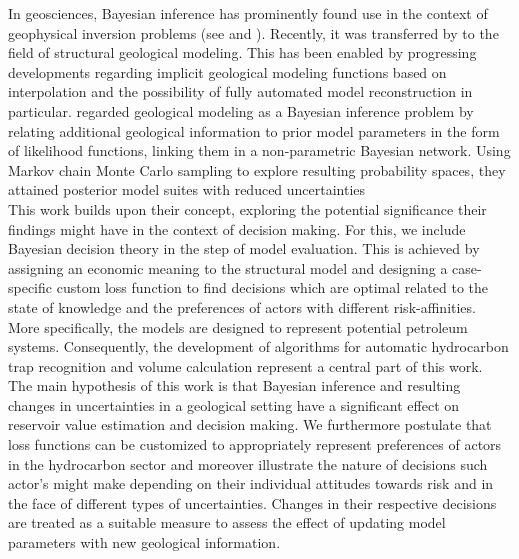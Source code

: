 In geosciences, Bayesian inference has prominently found use in the context of geophysical inversion problems (see \citet{tarantola1982inverse, mosegaard2002probabilistic} and \citet{sambridge2002monte}). Recently, it was transferred by \citet{delaVarga2016} to the field of structural geological modeling. This has been enabled by progressing developments regarding implicit geological modeling functions based on interpolation \citep{hillier2014three, mallet1992discrete, lajaunie1997foliation} and the possibility of fully automated model reconstruction in particular.  \citet{delaVarga2016} regarded geological modeling as a Bayesian inference problem by relating additional geological information to prior model parameters in the form of likelihood functions, linking them in a non-parametric Bayesian network. Using Markov chain Monte Carlo sampling to explore resulting probability spaces, they attained posterior model suites with reduced uncertainties \citep{delaVarga2016}\\
This work builds upon their concept, exploring the potential significance their findings might have in the context of decision making. For this, we include Bayesian decision theory in the step of model evaluation. This is achieved by assigning an economic meaning to the structural model and designing a case-specific custom loss function to find decisions which are optimal related to the state of knowledge and the preferences of actors with different risk-affinities. More specifically, the models are designed to represent potential petroleum systems. Consequently, the development of algorithms for automatic hydrocarbon trap recognition and volume calculation represent a central part of this work.\\
The main hypothesis of this work is that Bayesian inference and resulting changes in uncertainties in a geological setting have a significant effect on reservoir value estimation and decision making. We furthermore postulate that loss functions can be customized to appropriately represent preferences of actors in the hydrocarbon sector and moreover illustrate the nature of decisions such actor's might make depending on their individual attitudes towards risk and in the face of different types of uncertainties. Changes in their respective decisions are treated as a suitable measure to assess the effect of updating model parameters with new geological information.